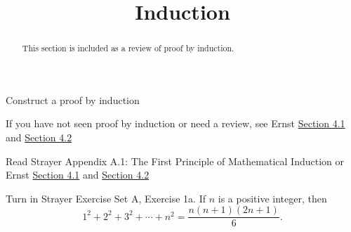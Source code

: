 \documentclass{ximera}
\title{Induction}
\begin{document}
\begin{abstract}
  This section is included as a review of proof by induction.
\end{abstract}
\maketitle


\begin{obj}
\item Construct a proof by induction
\end{obj}

If you have not seen proof by induction or need a review, see Ernst \href{https://danaernst.com/IBL-IntroToProof/pretext/sec_Intro_to_Induction.html}{Section 4.1} and \href{https://danaernst.com/IBL-IntroToProof/pretext/sec_More_on_Induction.html}{Section 4.2}

\begin{instructorNotes}
  
  \begin{pre}
    \item[Read] Strayer Appendix A.1: The First Principle of Mathematical Induction  or Ernst \href{https://danaernst.com/IBL-IntroToProof/pretext/sec_Intro_to_Induction.html}{Section 4.1} and \href{https://danaernst.com/IBL-IntroToProof/pretext/sec_More_on_Induction.html}{Section 4.2}
   
    \item[Turn in] Strayer Exercise Set A, Exercise 1a. If $n$ is a positive integer, then 
      \[1^2+2^2+3^2+\cdots+n^2=\frac{n(n+1)(2n+1)}{6}.\]
  \end{pre}
\end{instructorNotes}
\end{document}
